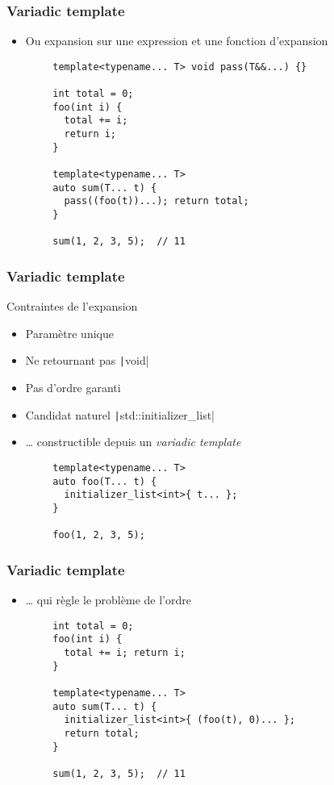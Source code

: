 \documentclass[C++.tex]{subfiles}
\begin{document}
\begin{frame}[fragile]
	\frametitle{Variadic template}
	\begin{itemize}
		\item Ou expansion sur une expression et une fonction d'expansion
	\end{itemize}

	\begin{verbatim}
		template<typename... T> void pass(T&&...) {}

		int total = 0;
		foo(int i) {
		  total += i; 
		  return i;
		}

		template<typename... T>
		auto sum(T... t) {
		  pass((foo(t))...); return total;
		}

		sum(1, 2, 3, 5);  // 11
	\end{verbatim}
\end{frame}

\begin{frame}[fragile]
	\frametitle{Variadic template}
	\begin{alertblock}{Contraintes de l'expansion}
		\begin{itemize}
			\item Paramètre unique
			\item Ne retournant pas \texttt|void|
			\item Pas d'ordre garanti
		\end{itemize}
	\end{alertblock}

	\begin{itemize}
		\item Candidat naturel \texttt|std::initializer_list|
		\item \ldots{} constructible depuis un \textit{variadic template}
	\end{itemize}

	\begin{verbatim}
		template<typename... T>
		auto foo(T... t) {
		  initializer_list<int>{ t... };
		}

		foo(1, 2, 3, 5);
	\end{verbatim}
\end{frame}

\begin{frame}[fragile]
	\frametitle{Variadic template}
	\begin{itemize}
		\item \ldots{} qui règle le problème de l'ordre
	\end{itemize}

	\begin{verbatim}
		int total = 0;
		foo(int i) {
		  total += i; return i;
		}

		template<typename... T>
		auto sum(T... t) {
		  initializer_list<int>{ (foo(t), 0)... };
		  return total;
		}

		sum(1, 2, 3, 5);  // 11
	\end{verbatim}

\end{frame}
\end{document}
